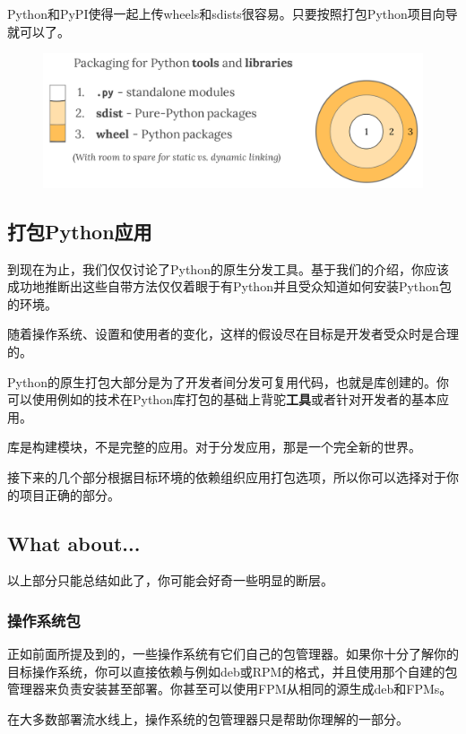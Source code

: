 \documentclass[../package_tutorial.tex]{subfiles}
\begin{document}
Python和PyPI使得一起上传wheels和sdists很容易。只要按照打包Python项目向导就可以了。

\begin{figure}[h]
    \centering
    \includegraphics[width=.8\textwidth]{../images/py_pkg_tools_and_libs.png}
\end{figure}

\subsection{打包Python应用}

到现在为止，我们仅仅讨论了Python的原生分发工具。基于我们的介绍，你应该成功地推断出这些自带方法仅仅着眼于有Python并且受众知道如何安装Python包的环境。

随着操作系统、设置和使用者的变化，这样的假设尽在目标是开发者受众时是合理的。

Python的原生打包大部分是为了开发者间分发可复用代码，也就是库创建的。你可以使用例如的技术在Python库打包的基础上背驼\textbf{工具}或者针对开发者的基本应用。

库是构建模块，不是完整的应用。对于分发应用，那是一个完全新的世界。

接下来的几个部分根据目标环境的依赖组织应用打包选项，所以你可以选择对于你的项目正确的部分。

\subsection{What about...}

以上部分只能总结如此了，你可能会好奇一些明显的断层。

\subsubsection{操作系统包}

正如前面所提及到的，一些操作系统有它们自己的包管理器。如果你十分了解你的目标操作系统，你可以直接依赖与例如deb或RPM的格式，并且使用那个自建的包管理器来负责安装甚至部署。你甚至可以使用FPM从相同的源生成deb和FPMs。

在大多数部署流水线上，操作系统的包管理器只是帮助你理解的一部分。
\end{document}
